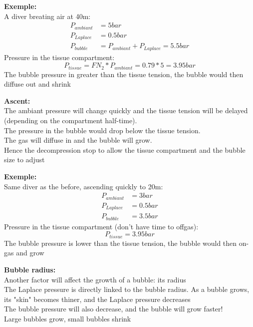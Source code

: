 \documentclass[aspectratio=1610,english,14pt]{beamer}
\begin{document}
\begin{frame}{\insertsubsection}
	\textbf{Exemple:}\\
	A diver breating air at 40m:
	\begin{align*}
		P_{ambiant}&=5bar\\
		P_{Laplace}&=0.5bar\\
		P_{bubble}&=P_{ambiant}+P_{Laplace}=5.5bar
	\end{align*}
	\pause
	Pressure in the tissue compartment:
	$$P_{tissue}=FN_2*P_{ambiant}=0.79*5=3.95bar$$
	\pause
	The bubble pressure in greater than the tissue tension, the bubble would then diffuse out and shrink
\end{frame}

\begin{frame}{\insertsubsection}
	\textbf{Ascent:}\\ 
	The ambiant pressure will change quickly and the tissue tension will be delayed (depending on the compartment half-time).\\
	\pause\vfill
	The pressure in the bubble would drop below the tissue tension.\\
	\pause\vfill
	The gas will diffuse in and the bubble will grow.\\
	\pause\vfill
	Hence the decompression stop to allow the tissue compartment and the bubble size to adjust
\end{frame}

\begin{frame}{\insertsubsection}
	\textbf{Exemple:}\\
	Same diver as the before, ascending quickly to 20m:
	\begin{align*}
		P_{ambiant}&=3bar\\
		P_{Laplace}&=0.5bar\\
		P_{bubble}&=3.5bar
	\end{align*}
	\pause
	Pressure in the tissue compartment (don't have time to offgas):
	$$P_{tissue}=3.95bar$$
	\pause
	The bubble pressure is lower than the tissue tension, the bubble would then on-gas and grow
\end{frame}

\begin{frame}{\insertsubsection}
	\textbf{Bubble radius:}\\
	Another factor will affect the growth of a bubble: its radius\\
	\pause \vfill
	The Laplace pressure is directly linked to the bubble radius. As a bubble grows, its "skin" becomes thiner, and the Laplace pressure decreases\\
	\pause \vfill
	The bubble pressure will also decrease, and the bubble will grow faster!\\
	\pause \vfill
	Large bubbles grow, small bubbles shrink
\end{frame}
\end{document}
